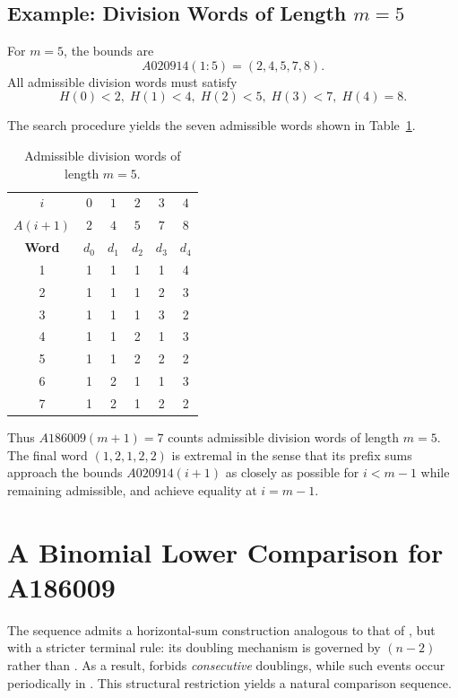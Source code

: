 \documentclass[12pt, oneside]{article}   	%
\numberwithin{equation}{section}          %
\theoremstyle{definition}
\begin{document}
\subsection*{Example: Division Words of Length $m=5$}

For $m=5$, the bounds are
\[
A020914(1{:}5) = (2,4,5,7,8).
\]
All admissible division words must satisfy
\[
H(0)<2,\; H(1)<4,\; H(2)<5,\; H(3)<7,\; H(4)=8.
\]

The search procedure yields the seven admissible words shown in
Table~\ref{tab:m5-words}.

\begin{table}[h]
\centering
\caption{Admissible division words of length $m=5$.}
\label{tab:m5-words}
\vspace{4pt}
\begin{tabular}{c|ccccc}
$i$ & $0$ & $1$ & $2$ & $3$ & $4$ \\
$A(i+1)$ & $2$ & $4$ & $5$ & $7$ & $8$ \\ \hline
\textbf{Word} & $d_0$ & $d_1$ & $d_2$ & $d_3$ & $d_4$ \\ \hline
1 & 1 & 1 & 1 & 1 & 4 \\
2 & 1 & 1 & 1 & 2 & 3 \\
3 & 1 & 1 & 1 & 3 & 2 \\
4 & 1 & 1 & 2 & 1 & 3 \\
5 & 1 & 1 & 2 & 2 & 2 \\
6 & 1 & 2 & 1 & 1 & 3 \\
7 & 1 & 2 & 1 & 2 & 2 \\
\end{tabular}
\end{table}

Thus $A186009(m+1)=7$ counts admissible division words of length $m=5$.  
The final word $(1,2,1,2,2)$ is extremal in the sense that its prefix sums
approach the bounds $A020914(i+1)$ as closely as possible for $i<m-1$
while remaining admissible, and achieve equality at $i=m-1$.


\newpage
\section{A Binomial Lower Comparison for A186009}
\label{app:A047749-lower-bound}

The sequence  admits a horizontal-sum construction analogous to that
of , but with a stricter terminal rule: its doubling mechanism is
governed by $(n-2)$ rather than . As a result,
 forbids \emph{consecutive} doublings, while such events occur
periodically in . This structural restriction yields a natural
comparison sequence.
\end{document}

